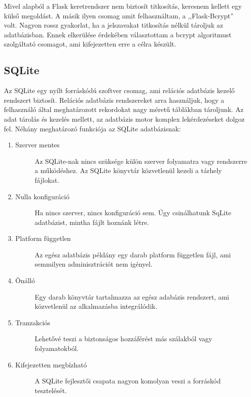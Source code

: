\documentclass{thesis-ekf}
\theoremstyle{definition}
\theoremstyle{remark}
\begin{document}
Mivel alapból a Flask keretrendszer nem biztosít titkosítás, keresnem kellett egy külső megoldást.
A másik ilyen csomag amit felhasználtam, a ,,Flask-Bcrypt'' volt.
Nagyon rossz gyakorlat, ha a jelszavakat titkosítás nélkül tároljuk az adatbázisban.
Ennek elkerülése érdekében választottam a bcrypt algoritmust szolgáltató csomagot, ami kifejezetten erre a célra készült.

\subsection{SQLite}

Az SQLite egy nyílt forráskódú szoftver csomag, ami relációs adatbázis kezelő rendszert biztosít.
Relációs adatbázis rendszereket arra használjuk, hogy a felhasználó által meghatározott rekordokat nagy méretű táblákban tároljunk.
Az adat tárolás és kezelés mellett, az adatbázis motor komplex lekérdezéseket dolgoz fel.
Néhány meghatározó funkciója az SQLite adatbázisnak:

\begin{enumerate}
	\item
	\begin{description}
		\item[Szerver mentes] Az SQLite-nak nincs szüksége külön szerver folyamatra vagy rendszerre a működéshez. Az SQLite könyvtár közvetlenül kezeli a tárhely fájlokat.
	\end{description}
	\item
	\begin{description}
		\item[Nulla konfiguráció] Ha nincs szerver, nincs konfiguráció sem. Úgy csinálhatunk SqLite adatbázist, mintha fájlt hoznánk létre.
	\end{description}
	\item
	\begin{description}
		\item[Platform független] Az egész adatbázis példány egy darab platform független fájl, ami semmilyen adminisztrációt nem igényel.
	\end{description}
	\item
	\begin{description}
		\item[Önálló] Egy darab könyvtár tartalmazza az egész adabázis rendszert, ami közvetlenül az alkalmazásba integrálódik.
	\end{description}
	\item
	\begin{description}
		\item[Tranzakciós] Lehetővé teszi a biztonságos hozzáférést más szálakból vagy folyamatokból.
	\end{description}
	\item
	\begin{description}
		\item[Kifejezetten megbízható] A SQLite fejlesztői csapata nagyon komolyan veszi a forráskód tesztelését.
	\end{description}
\end{enumerate}
\end{document}
